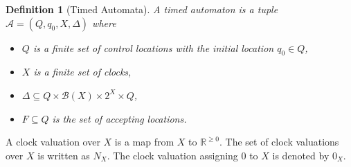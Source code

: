 \documentclass{llncs}
\newtheorem{Def}{Definition}
\newcommand{\nnegreal}{\mathbb{R}^{\geq 0}}
\begin{document}
\begin{Def}[Timed Automata]
  A timed automaton is a tuple $\mathcal{A}=(Q,q_0,X,\Delta)$ where
  \begin{itemize}
    \item $Q$ is a finite set of control locations 
    with the initial location $q_0\in Q$,
    \item $X$ is a finite set of clocks,
    \item $\Delta\subseteq Q\times\mathcal{B}(X)\times 2^X\times Q$,
    \item $F\subseteq Q$ is the set of accepting locations.
  \end{itemize}
\end{Def}


A clock valuation over $X$ is a map from $X$ to $\nnegreal$.   The set of clock valuations over $X$
is written as $N_X$.  The clock valuation assigning 0 to $X$ is denoted by $0_X$.
\end{document}
